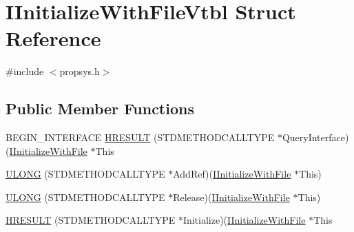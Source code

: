 \hypertarget{struct_i_initialize_with_file_vtbl}{}\section{I\+Initialize\+With\+File\+Vtbl Struct Reference}
\label{struct_i_initialize_with_file_vtbl}


{\ttfamily \#include $<$propsys.\+h$>$}

\subsection*{Public Member Functions}
\begin{DoxyCompactItemize}
\item 
B\+E\+G\+I\+N\+\_\+\+I\+N\+T\+E\+R\+F\+A\+CE \hyperlink{struct_i_initialize_with_file_vtbl_ad84ecec3bb0803fc068a9511842fefc1}{H\+R\+E\+S\+U\+LT} (S\+T\+D\+M\+E\+T\+H\+O\+D\+C\+A\+L\+L\+T\+Y\+PE $\ast$Query\+Interface)(\hyperlink{propsys_8h_a45214e500f1204ce9278a97dfa379165}{I\+Initialize\+With\+File} $\ast$This
\item 
\hyperlink{struct_i_initialize_with_file_vtbl_ac3f0e7775bff3be60f1a085751c650ea}{U\+L\+O\+NG} (S\+T\+D\+M\+E\+T\+H\+O\+D\+C\+A\+L\+L\+T\+Y\+PE $\ast$Add\+Ref)(\hyperlink{propsys_8h_a45214e500f1204ce9278a97dfa379165}{I\+Initialize\+With\+File} $\ast$This)
\item 
\hyperlink{struct_i_initialize_with_file_vtbl_a9312487505c7663814550ede8462d419}{U\+L\+O\+NG} (S\+T\+D\+M\+E\+T\+H\+O\+D\+C\+A\+L\+L\+T\+Y\+PE $\ast$Release)(\hyperlink{propsys_8h_a45214e500f1204ce9278a97dfa379165}{I\+Initialize\+With\+File} $\ast$This)
\item 
\hyperlink{struct_i_initialize_with_file_vtbl_ac279499a47310746c4f758d7a930901c}{H\+R\+E\+S\+U\+LT} (S\+T\+D\+M\+E\+T\+H\+O\+D\+C\+A\+L\+L\+T\+Y\+PE $\ast$Initialize)(\hyperlink{propsys_8h_a45214e500f1204ce9278a97dfa379165}{I\+Initialize\+With\+File} $\ast$This
\end{DoxyCompactItemize}

